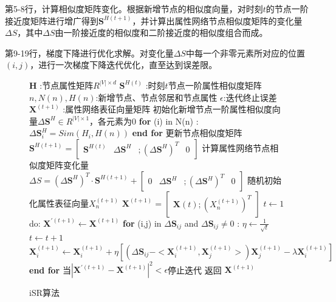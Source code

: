 第5-8行，计算相似度矩阵变化。根据新增节点的相似度向量，对时刻$t$的节点一阶接近度矩阵进行增广得到$\textbf{S}^{H(t+1)}$，并计算出属性网络节点相似度矩阵的变化量$\Delta S$，其中$\Delta S$由一阶接近度的相似度和二阶接近度的相似度组合而成。

第9-19行，梯度下降进行优化求解。对变化量$\Delta S$中每一个非零元素所对应的位置$(i,j)$，进行一次梯度下降迭代优化，直至达到误差限。
\begin{figure}[htb]
	\centering
	\begin{minipage}{.7\linewidth}
		\begin{algorithm}[H]
			\small
			\caption{iSR算法}
			\begin{algorithmic}[1]
				\Require
				\Statex $\textbf{H}$ :节点属性矩阵$R^{|V|\times d}$
				\Statex$\textbf{S}^{H(t)}$ :时刻$t$节点一阶属性相似度矩阵
				\Statex $n, N(n), H(n)$:新增节点、节点邻居和节点属性 
				\Statex $\epsilon$:迭代终止误差
				\Ensure
				\Statex $\textbf{X}^{(t+1)}$ :属性网络表征向量矩阵
				\Statex
				\State 初始化新增节点一阶属性相似度向量$\Delta\textbf{S}^{H} \in R^{|V|\times 1}$，各元素为0
				\State \textbf{for} (i) in N(n) :
				\State \quad $\Delta\textbf{S}^{H}_i =Sim(H_i, H(n))$
				\State \textbf{end for}
				\State 更新节点相似度矩阵$\textbf{S}^{H(t+1)} = \begin{bmatrix}  \textbf{S}^{H(t)} & \Delta\textbf{S}^{H}& ;
				(\Delta\textbf{S}^{H})^T & 0 \end{bmatrix}$ 
				\State 计算属性网络节点相似度矩阵变化量$\Delta S = (\Delta\textbf{S}^{H})^T\cdot \textbf{S}^{H(t+1)} +\begin{bmatrix}  0 & \Delta\textbf{S}^{H}& ;
				(\Delta\textbf{S}^{H})^T & 0 \end{bmatrix}$
				\State 随机初始化属性表征向量$X^{(t+1)}_n$
				\State $\textbf{X}^{(t+1)} = \begin{bmatrix}
				\textbf{X}{(t)}; (X^{(t+1)}_n)^T
				\end{bmatrix}$
				\State $t \leftarrow 1$
				\State do:
				\State \quad $\textbf{X}^{\prime(t+1)}\leftarrow\textbf{X}^{(t+1)} $
				\State\quad \textbf{for} (i,j) in $\Delta\textbf{S}_{ij}$ and $\Delta\textbf{S}_{ij}\ne 0$ :
				\State\qquad $\eta \leftarrow \frac{1}{\sqrt{t}}$
				\State\qquad $t\leftarrow t+1$
				\State\qquad $\textbf{X}^{(t+1)}_i \leftarrow \textbf{X}^{(t+1)}_i + \eta [(\Delta\textbf{S}_{ij}-<\textbf{X}^{(t+1)}_i, \textbf{X}^{(t+1)}_j>)\textbf{X}^{(t+1)}_j - \lambda \textbf{X}^{(t+1)}_i]$
				\State \quad \textbf{end for}
				\State 当$|\textbf{X}^{\prime(t+1)}-\textbf{X}^{(t+1)}|^2<\epsilon$停止迭代
				\State 返回 $\textbf{X}^{(t+1)}$
			\end{algorithmic}
		\end{algorithm}
	\end{minipage}
\end{figure}

